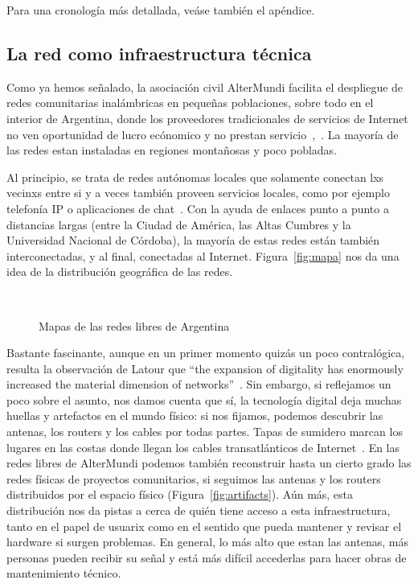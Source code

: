 Para una cronología más detallada, veáse también el apéndice.

\subsection{La red como infraestructura técnica}

Como ya hemos señalado, la asociación civil AlterMundi facilita el despliegue de redes comunitarias inalámbricas en pequeñas poblaciones, sobre todo en el interior de Argentina, donde los proveedores tradicionales de servicios de Internet no ven oportunidad de lucro ecónomico y no prestan servicio~\autocite{Piccoli2015},~\autocite{Vaseva2016a}.
La mayoría de las redes estan instaladas en regiones montañosas y poco pobladas.

Al principio, se trata de redes autónomas locales que solamente conectan lxs vecinxs entre si y a veces también proveen servicios locales, como por ejemplo telefonía IP o aplicaciones de chat~\autocite{Piccoli2015}.
Con la ayuda de enlaces punto a punto a distancias largas (entre la Ciudad de América, las Altas Cumbres y la Universidad Nacional de Córdoba), la mayoría de estas redes están también interconectadas, y al final, conectadas al Internet.
Figura~\vref{fig:mapa} nos da una idea de la distribución geográfica de las redes.

\begin{figure}[h]
\centering
{} \\
\caption[mapas]{Mapas de las redes libres de Argentina} %
\label{fig:mapa}
\end{figure}

Bastante fascinante, aunque en un primer momento quizás un poco contralógica, resulta la observación de Latour que ``the expansion of digitality has enormously increased the material dimension of networks''~\autocite{Latour2010}.
Sin embargo, si reflejamos un poco sobre el asunto, nos damos cuenta que sí, la tecnología digital deja muchas huellas y artefactos en el mundo físico: si nos fijamos, podemos descubrir las antenas, los routers y los cables por todas partes.
Tapas de sumidero marcan los lugares en las costas donde llegan los cables transatlánticos de Internet~\autocite{Roth2015}.
En las redes libres de AlterMundi podemos también reconstruir hasta un cierto grado las redes físicas de proyectos comunitarios, si seguimos las antenas y los routers distribuidos por el espacio físico (Figura~\vref{fig:artifacts}).
Aún más, esta distribución nos da pistas a cerca de quién tiene acceso a esta infraestructura, tanto en el papel de usuarix como en el sentido que pueda mantener y revisar el hardware si surgen problemas.
En general, lo más alto que estan las antenas, más personas pueden recibir su señal y está más difícil accederlas para hacer obras de mantenimiento técnico.

